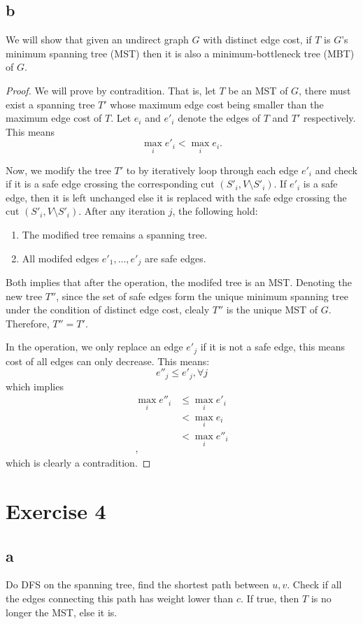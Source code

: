 \documentclass[a4paper,10pt,twoside]{article}
\newtheorem{proof}{Proof}
\begin{document}
\subsection*{b}
We will show that given an undirect graph $G$ with distinct edge
cost, if $T$ is $G$'s minimum spanning
tree (MST) then it is also a minimum-bottleneck tree (MBT) of $G$.
\begin{proof}
	We will prove by contradition. That is, let $T$ be an MST of $G$,
	there must exist a spanning tree $T'$ whose maximum edge cost
	being smaller than the maximum edge cost of $T$.
	Let $e_i$ and $e'_i$ denote the edges of $T$ and $T'$ respectively.
	This means
	\[
		\max_i{e'_i} < \max_i{e_i}.
	\]

	Now, we modify the tree $T'$ to by iteratively
	loop through each edge $e'_i$ and check if it is a safe edge crossing
	the corresponding cut $(S'_i, V\setminus S'_i)$. If $e'_i$ is a safe
	edge, then it is left unchanged else it is replaced with the safe edge
	crossing the cut $(S'_i, V\setminus S'_i)$.
	After any iteration $j$, the following hold:
	\begin{enumerate}
		\item The modified tree remains a spanning tree.
		\item All modifed edges $e'_1, ..., e'_j$ are safe edges.
	\end{enumerate}

	Both implies that after the operation, the modifed tree is an MST.
	Denoting the new tree $T''$, since the set of safe edges form the unique
	minimum spanning tree under the condition of distinct edge cost, clealy
	$T''$ is the unique MST of $G$. Therefore, $T'' = T'$.

	In the operation, we only replace an edge $e'_j$ if it is not a safe edge,
	this means cost of all edges can only decrease. This means:
	\[
		e''_j \leq e'_j, \forall j
	\]
	which implies
	\[
	\begin{aligned}
		\max_i e''_i &\leq \max_i e'_i \\
					 &< \max_i e_i\\
					 &< \max_i e''_i\\,
	\end{aligned}
	\]
	which is clearly a contradition.
\end{proof}
\section*{Exercise 4}
\subsection*{a}
Do DFS on the spanning tree, find the shortest path between $u, v$.
Check if all the edges connecting this path has weight lower than $c$.
If true, then $T$ is no longer the MST, else it is.
\end{document}
